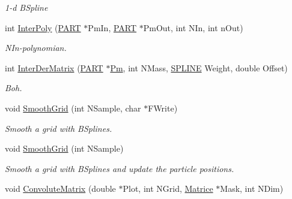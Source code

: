 \begin{DoxyCompactItemize}
\begin{DoxyCompactList}\small\item\em 1-\/d B\+Spline \end{DoxyCompactList}\item 
int \hyperlink{classVarData_a5141ff7cee13195dd687b6e42348f980}{Inter\+Poly} (\hyperlink{structPART}{P\+A\+RT} $\ast$Pm\+In, \hyperlink{structPART}{P\+A\+RT} $\ast$Pm\+Out, int N\+In, int n\+Out)\hypertarget{classVarData_a5141ff7cee13195dd687b6e42348f980}{}\label{classVarData_a5141ff7cee13195dd687b6e42348f980}

\begin{DoxyCompactList}\small\item\em N\+In-\/polynomian. \end{DoxyCompactList}\item 
int \hyperlink{classVarData_af85a557ebde1a4d48c3b228bde661087}{Inter\+Der\+Matrix} (\hyperlink{structPART}{P\+A\+RT} $\ast$\hyperlink{classVarData_a53eee20378b4a2c61407897d98a4b5d7}{Pm}, int N\+Mass, \hyperlink{structSPLINE}{S\+P\+L\+I\+NE} Weight, double Offset)\hypertarget{classVarData_af85a557ebde1a4d48c3b228bde661087}{}\label{classVarData_af85a557ebde1a4d48c3b228bde661087}

\begin{DoxyCompactList}\small\item\em Boh. \end{DoxyCompactList}\item 
void \hyperlink{classVarData_a3d0e967c8f2515c16170245de47ffcbe}{Smooth\+Grid} (int N\+Sample, char $\ast$F\+Write)\hypertarget{classVarData_a3d0e967c8f2515c16170245de47ffcbe}{}\label{classVarData_a3d0e967c8f2515c16170245de47ffcbe}

\begin{DoxyCompactList}\small\item\em Smooth a grid with B\+Splines. \end{DoxyCompactList}\item 
void \hyperlink{classVarData_a5963ed99faa37dbc4de06d8ee376fd20}{Smooth\+Grid} (int N\+Sample)
\begin{DoxyCompactList}\small\item\em Smooth a grid with B\+Splines and update the particle positions. \end{DoxyCompactList}\item 
void \hyperlink{classVarData_af94063719b4ada99c5cc0f493c3168dc}{Convolute\+Matrix} (double $\ast$Plot, int N\+Grid, \hyperlink{classMatrice}{Matrice} $\ast$Mask, int N\+Dim)\hypertarget{classVarData_af94063719b4ada99c5cc0f493c3168dc}{}\label{classVarData_af94063719b4ada99c5cc0f493c3168dc}


\end{DoxyCompactItemize}
